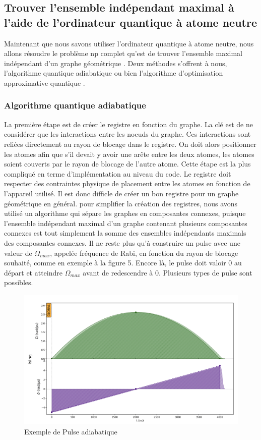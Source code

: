 \documentclass[11pt]{article}
\begin{document}
\subsection{Trouver l'ensemble indépendant maximal à l'aide de l'ordinateur quantique à atome neutre}
Maintenant que nous savons utiliser l'ordinateur quantique à atome neutre, nous allons résoudre le problème np complet \cite{tarjan_finding_1977} qu'est de trouver l'ensemble maximal indépendant d'un graphe géométrique \cite{dettmann_random_2016}. Deux méthodes s'offrent à nous, l'algorithme quantique adiabatique ou bien l'algorithme d'optimisation approximative quantique \cite{ebadi_quantum_2022}.

\subsubsection{Algorithme quantique adiabatique}
La première étape est de créer le registre en fonction du graphe. La clé est de ne considérer que les interactions entre les noeuds du graphe. Ces interactions sont reliées directement au rayon de blocage dans le registre. On doit alors positionner les atomes afin que s'il devait y avoir une arête entre les deux atomes, les atomes soient couverts par le rayon de blocage de l'autre atome. Cette étape est la plus compliqué en terme d'implémentation au niveau du code. Le registre doit respecter des contraintes physique de placement entre les atomes en fonction de l'appareil utilisé. Il est donc difficle de créer un bon registre pour un graphe géométrique en général. pour simplifier la création des registres, nous avons utilisé un algorithme qui sépare les graphes en composantes connexes, puisque l'ensemble indépendant maximal d'un graphe contenant plusieurs composantes connexes est tout simplement la somme des ensembles indépendants maximals des composantes connexes. Il ne reste plus qu'à construire un pulse avec une valeur de $\Omega_{max}$, appelée fréquence de Rabi, en fonction du rayon de blocage souhaité, comme en exemple à la figure 5. Encore là, le pulse doit valoir 0 au départ et atteindre $\Omega_{max}$ avant de redescendre à 0. Plusieurs types de pulse sont possibles. 
\begin{figure}[H]
    \centering
    \includegraphics[width = 0.6\linewidth]{images/pulse_exemple.png}
    \caption{Exemple de Pulse adiabatique}
    \label{pulse_exemple}
\end{figure}
\end{document}
